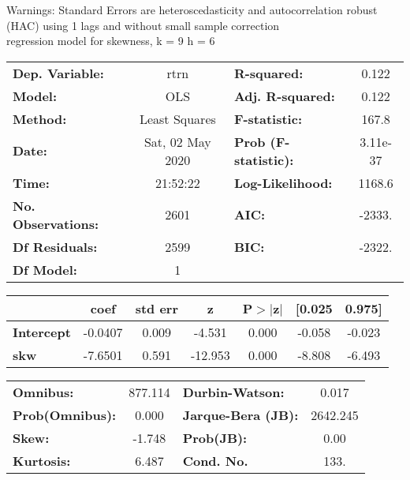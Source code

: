 Warnings: \newline
 [1] Standard Errors are heteroscedasticity and autocorrelation robust (HAC) using 1 lags and without small sample correction\\ 

regression model for skewness, k = 9 h = 6\begin{center}
\begin{tabular}{lclc}
\toprule
\textbf{Dep. Variable:}    &       rtrn       & \textbf{  R-squared:         } &     0.122   \\
\textbf{Model:}            &       OLS        & \textbf{  Adj. R-squared:    } &     0.122   \\
\textbf{Method:}           &  Least Squares   & \textbf{  F-statistic:       } &     167.8   \\
\textbf{Date:}             & Sat, 02 May 2020 & \textbf{  Prob (F-statistic):} &  3.11e-37   \\
\textbf{Time:}             &     21:52:22     & \textbf{  Log-Likelihood:    } &    1168.6   \\
\textbf{No. Observations:} &        2601      & \textbf{  AIC:               } &    -2333.   \\
\textbf{Df Residuals:}     &        2599      & \textbf{  BIC:               } &    -2322.   \\
\textbf{Df Model:}         &           1      & \textbf{                     } &             \\
\bottomrule
\end{tabular}
\begin{tabular}{lcccccc}
                   & \textbf{coef} & \textbf{std err} & \textbf{z} & \textbf{P$> |$z$|$} & \textbf{[0.025} & \textbf{0.975]}  \\
\midrule
\textbf{Intercept} &      -0.0407  &        0.009     &    -4.531  &         0.000        &       -0.058    &       -0.023     \\
\textbf{skw}       &      -7.6501  &        0.591     &   -12.953  &         0.000        &       -8.808    &       -6.493     \\
\bottomrule
\end{tabular}
\begin{tabular}{lclc}
\textbf{Omnibus:}       & 877.114 & \textbf{  Durbin-Watson:     } &    0.017  \\
\textbf{Prob(Omnibus):} &   0.000 & \textbf{  Jarque-Bera (JB):  } & 2642.245  \\
\textbf{Skew:}          &  -1.748 & \textbf{  Prob(JB):          } &     0.00  \\
\textbf{Kurtosis:}      &   6.487 & \textbf{  Cond. No.          } &     133.  \\
\bottomrule
\end{tabular}
\end{center}

